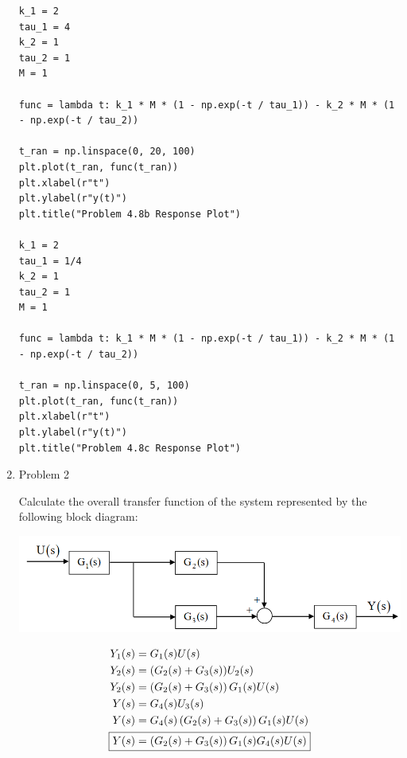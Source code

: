 \documentclass[12pt]{article}
\begin{document}
\begin{enumerate}
\begin{verbatim}
k_1 = 2
tau_1 = 4
k_2 = 1
tau_2 = 1
M = 1

func = lambda t: k_1 * M * (1 - np.exp(-t / tau_1)) - k_2 * M * (1 - np.exp(-t / tau_2))

t_ran = np.linspace(0, 20, 100)
plt.plot(t_ran, func(t_ran))
plt.xlabel(r"t")
plt.ylabel(r"y(t)")
plt.title("Problem 4.8b Response Plot")

k_1 = 2
tau_1 = 1/4
k_2 = 1
tau_2 = 1
M = 1

func = lambda t: k_1 * M * (1 - np.exp(-t / tau_1)) - k_2 * M * (1 - np.exp(-t / tau_2))

t_ran = np.linspace(0, 5, 100)
plt.plot(t_ran, func(t_ran))
plt.xlabel(r"t")
plt.ylabel(r"y(t)")
plt.title("Problem 4.8c Response Plot")
\end{verbatim}

\newpage
\item Problem 2

Calculate the overall transfer function of the system represented by the following block
diagram:

\includegraphics[scale=0.8]{p2.png}

\begin{align*}
    Y_1(s) &= G_1(s) U(s) \\
    Y_2(s) &= (G_2(s) + G_3(s)) U_2(s) \\
    Y_2(s) &= \left(G_2(s) + G_3(s)\right) G_1(s) U(s) \\
    Y(s) &= G_4(s) U_3(s) \\
    Y(s) &= G_4(s) \left(G_2(s) + G_3(s)\right) G_1(s) U(s) \\
    \Aboxed{Y(s) &= \left(G_2(s) + G_3(s)\right) G_1(s) G_4(s) U(s)}
\end{align*}



\end{enumerate}
\end{document}
